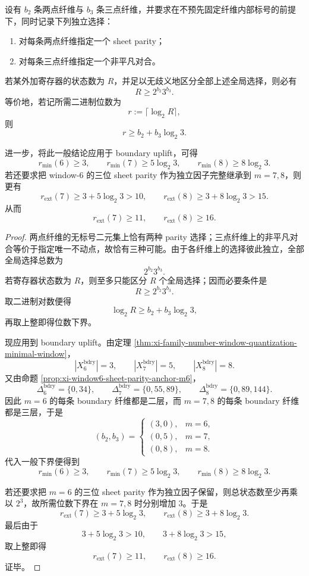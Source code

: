 \begin{theorem}\label{thm:xi-boundary-uplift-mixed-radix-register-lower-bound}
设有 \(b_2\) 条两点纤维与 \(b_3\) 条三点纤维，并要求在不预先固定纤维内部标号的前提下，同时记录下列独立选择：
\begin{enumerate}
  \item 对每条两点纤维指定一个 sheet parity；
  \item 对每条三点纤维指定一个非平凡对合。
\end{enumerate}
若某外加寄存器的状态数为 \(R\)，并足以无歧义地区分全部上述全局选择，则必有
\[
\boxed{\;
R\ge 2^{b_2}3^{b_3}.\;}
\]
等价地，若记所需二进制位数为
\[
r:=\lceil \log_2 R\rceil,
\]
则
\[
\boxed{\;
r\ge b_2+b_3\log_2 3.\;}
\]

进一步，将此一般结论应用于 boundary uplift，可得
\[
\boxed{\;
r_{\min}(6)\ge 3,\qquad
r_{\min}(7)\ge 5\log_2 3,\qquad
r_{\min}(8)\ge 8\log_2 3.\;}
\]
若还要求把 window-\(6\) 的三位 sheet parity 作为独立因子完整继承到 \(m=7,8\)，则更有
\[
\boxed{\;
r_{\mathrm{ext}}(7)\ge 3+5\log_2 3>10,\qquad
r_{\mathrm{ext}}(8)\ge 3+8\log_2 3>15.\;}
\]
从而
\[
\boxed{\;
r_{\mathrm{ext}}(7)\ge 11,\qquad
r_{\mathrm{ext}}(8)\ge 16.\;}
\]
\end{theorem}
\begin{proof}
两点纤维的无标号二元集上恰有两种 parity 选择；三点纤维上的非平凡对合等价于指定唯一不动点，故恰有三种可能。由于各纤维上的选择彼此独立，全部全局选择总数为
\[
2^{b_2}3^{b_3}.
\]
若寄存器状态数为 \(R\)，则至多只能区分 \(R\) 个全局选择；因而必要条件是
\[
R\ge 2^{b_2}3^{b_3}.
\]
取二进制对数便得
\[
\log_2 R\ge b_2+b_3\log_2 3,
\]
再取上整即得位数下界。

现应用到 boundary uplift。由定理 \ref{thm:xi-family-number-window-quantization-minimal-window}，
\[
|X_6^{\mathrm{bdry}}|=3,\qquad
|X_7^{\mathrm{bdry}}|=5,\qquad
|X_8^{\mathrm{bdry}}|=8.
\]
又由命题 \ref{prop:xi-window6-sheet-parity-anchor-m6}，
\[
\Delta_6^{\mathrm{bdry}}=\{0,34\},
\qquad
\Delta_7^{\mathrm{bdry}}=\{0,55,89\},
\qquad
\Delta_8^{\mathrm{bdry}}=\{0,89,144\}.
\]
因此 \(m=6\) 的每条 boundary 纤维都是二层，而 \(m=7,8\) 的每条 boundary 纤维都是三层，于是
\[
(b_2,b_3)=
\begin{cases}
(3,0),& m=6,\\
(0,5),& m=7,\\
(0,8),& m=8.
\end{cases}
\]
代入一般下界便得到
\[
r_{\min}(6)\ge 3,\qquad
r_{\min}(7)\ge 5\log_2 3,\qquad
r_{\min}(8)\ge 8\log_2 3.
\]

若还要求把 \(m=6\) 的三位 sheet parity 作为独立因子保留，则总状态数至少再乘以 \(2^3\)，故所需位数下界在 \(m=7,8\) 时分别增加 \(3\)。于是
\[
r_{\mathrm{ext}}(7)\ge 3+5\log_2 3,\qquad
r_{\mathrm{ext}}(8)\ge 3+8\log_2 3.
\]
最后由于
\[
3+5\log_2 3>10,
\qquad
3+8\log_2 3>15,
\]
取上整即得
\[
r_{\mathrm{ext}}(7)\ge 11,
\qquad
r_{\mathrm{ext}}(8)\ge 16.
\]
证毕。
\end{proof}

